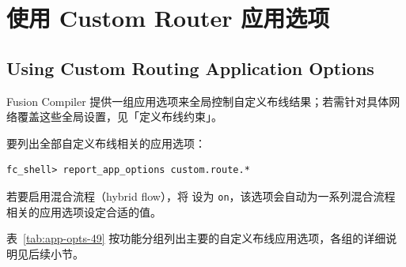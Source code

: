 \section{使用 Custom Router 应用选项}
\subsection*{Using Custom Routing Application Options}

Fusion Compiler 提供一组应用选项来全局控制自定义布线结果；若需针对具体网络覆盖这些全局设置，见「定义布线约束」。

要列出全部自定义布线相关的应用选项：
\begin{lstlisting}
fc_shell> report_app_options custom.route.*
\end{lstlisting}

若要启用混合流程（hybrid flow），将  设为 \texttt{on}，该选项会自动为一系列混合流程相关的应用选项设定合适的值。

表~\ref{tab:app-opts-49} 按功能分组列出主要的自定义布线应用选项，各组的详细说明见后续小节。

